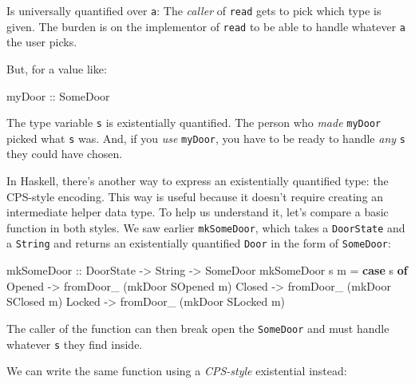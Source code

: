 \documentclass[]{article}
\newenvironment{Shaded}{}{}
\newcommand{\DataTypeTok}[1]{\textcolor[rgb]{0.56,0.13,0.00}{#1}}
\newcommand{\KeywordTok}[1]{\textcolor[rgb]{0.00,0.44,0.13}{\textbf{#1}}}
\newcommand{\NormalTok}[1]{#1}
\newcommand{\OtherTok}[1]{\textcolor[rgb]{0.00,0.44,0.13}{#1}}
\begin{document}
Is universally quantified over \texttt{a}: The \emph{caller} of \texttt{read}
gets to pick which type is given. The burden is on the implementor of
\texttt{read} to be able to handle whatever \texttt{a} the user picks.

But, for a value like:

\begin{Shaded}
\begin{Highlighting}[]
\OtherTok{myDoor ::} \DataTypeTok{SomeDoor}
\end{Highlighting}
\end{Shaded}

The type variable \texttt{s} is existentially quantified. The person who
\emph{made} \texttt{myDoor} picked what \texttt{s} was. And, if you \emph{use}
\texttt{myDoor}, you have to be ready to handle \emph{any} \texttt{s} they could
have chosen.

In Haskell, there's another way to express an existentially quantified type: the
CPS-style encoding. This way is useful because it doesn't require creating an
intermediate helper data type. To help us understand it, let's compare a basic
function in both styles. We saw earlier \texttt{mkSomeDoor}, which takes a
\texttt{DoorState} and a \texttt{String} and returns an existentially quantified
\texttt{Door} in the form of \texttt{SomeDoor}:

\begin{Shaded}
\begin{Highlighting}[]
\NormalTok{mkSomeDoor}
\OtherTok{    ::} \DataTypeTok{DoorState}
    \OtherTok{{-}>} \DataTypeTok{String}
    \OtherTok{{-}>} \DataTypeTok{SomeDoor}
\NormalTok{mkSomeDoor s m }\OtherTok{=} \KeywordTok{case}\NormalTok{ s }\KeywordTok{of}
    \DataTypeTok{Opened} \OtherTok{{-}>}\NormalTok{ fromDoor\_ (mkDoor }\DataTypeTok{SOpened}\NormalTok{ m)}
    \DataTypeTok{Closed} \OtherTok{{-}>}\NormalTok{ fromDoor\_ (mkDoor }\DataTypeTok{SClosed}\NormalTok{ m)}
    \DataTypeTok{Locked} \OtherTok{{-}>}\NormalTok{ fromDoor\_ (mkDoor }\DataTypeTok{SLocked}\NormalTok{ m)}
\end{Highlighting}
\end{Shaded}

The caller of the function can then break open the \texttt{SomeDoor} and must
handle whatever \texttt{s} they find inside.

We can write the same function using a \emph{CPS-style} existential instead:
\end{document}
